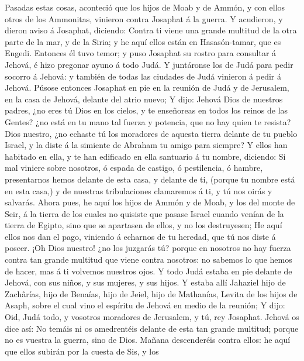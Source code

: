  Pasadas estas cosas, aconteció que los hijos de Moab y de
Ammón, y con ellos otros de los Ammonitas, vinieron contra Josaphat á la
guerra.  Y acudieron, y dieron aviso á Josaphat, diciendo:
Contra ti viene una grande multitud de la otra parte de la mar, y de la
Siria; y he aquí ellos están en Hasasón-tamar, que es Engedi.
 Entonces él tuvo temor; y puso Josaphat su rostro para
consultar á Jehová, é hizo pregonar ayuno á todo Judá.  Y
juntáronse los de Judá para pedir socorro á Jehová: y también de todas
las ciudades de Judá vinieron á pedir á Jehová.  Púsose
entonces Josaphat en pie en la reunión de Judá y de Jerusalem, en la
casa de Jehová, delante del atrio nuevo;  Y dijo: Jehová
Dios de nuestros padres, ¿no eres tú Dios en los cielos, y te enseñoreas
en todos los reinos de las Gentes? ¿no está en tu mano tal fuerza y
potencia, que no hay quien te resista?  Dios nuestro, ¿no
echaste tú los moradores de aquesta tierra delante de tu pueblo Israel,
y la diste á la simiente de Abraham tu amigo para siempre? 
Y ellos han habitado en ella, y te han edificado en ella santuario á tu
nombre, diciendo:  Si mal viniere sobre nosotros, ó espada
de castigo, ó pestilencia, ó hambre, presentarnos hemos delante de esta
casa, y delante de ti, (porque tu nombre está en esta casa,) y de
nuestras tribulaciones clamaremos á ti, y tú nos oirás y salvarás.
 Ahora pues, he aquí los hijos de Ammón y de Moab, y los
del monte de Seir, á la tierra de los cuales no quisiste que pasase
Israel cuando venían de la tierra de Egipto, sino que se apartasen de
ellos, y no los destruyesen;  He aquí ellos nos dan el
pago, viniendo á echarnos de tu heredad, que tú nos diste á poseer.
 ¡Oh Dios nuestro! ¿no los juzgarás tú? porque en nosotros
no hay fuerza contra tan grande multitud que viene contra nosotros: no
sabemos lo que hemos de hacer, mas á ti volvemos nuestros ojos.
 Y todo Judá estaba en pie delante de Jehová, con sus
niños, y sus mujeres, y sus hijos.  Y estaba allí Jahaziel
hijo de Zachârías, hijo de Benaías, hijo de Jeiel, hijo de Mathanías,
Levita de los hijos de Asaph, sobre el cual vino el espíritu de Jehová
en medio de la reunión;  Y dijo: Oid, Judá todo, y vosotros
moradores de Jerusalem, y tú, rey Josaphat. Jehová os dice así: No
temáis ni os amedrentéis delante de esta tan grande multitud; porque no
es vuestra la guerra, sino de Dios.  Mañana descenderéis
contra ellos: he aquí que ellos subirán por la cuesta de Sis, y los
